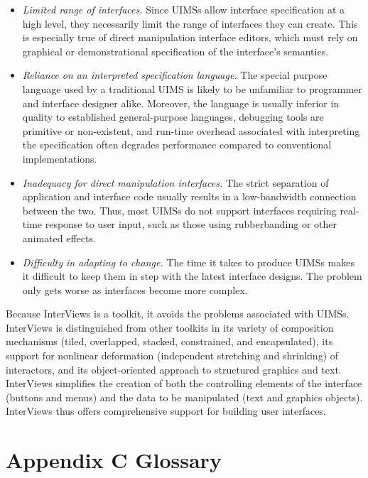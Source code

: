 \begin{itemize}

\item {\em Limited range of interfaces.}  Since UIMSs allow interface
specification at a high level, they necessarily limit the range of
interfaces they can create.  This is especially true of direct
manipulation interface editors, which must rely on graphical or
demonstrational specification of the interface's semantics.

\item {\em Reliance on an interpreted specification language.}
The special purpose language used by a traditional UIMS is likely to
be unfamiliar to programmer and interface designer alike.  Moreover,
the language is usually inferior in quality to established
general-purpose languages, debugging tools are primitive or
non-existent, and run-time overhead associated with interpreting the
specification often degrades performance compared to conventional
implementations.

\item {\em Inadequacy for direct manipulation interfaces.}  The strict
separation of application and interface code usually results in a
low-bandwidth connection between the two.  Thus, most UIMSs do not
support interfaces requiring real-time response to user input, such as
those using rubberbanding or other animated effects.

\item {\em Difficulty in adapting to change.}
The time it takes to produce UIMSs makes it difficult to keep them in
step with the latest interface designs.  The problem only gets
worse as interfaces become more complex.

\end{itemize}

Because InterViews is a toolkit, it avoids the problems associated
with UIMSs.  InterViews is distinguished from other toolkits in its
variety of composition mechanisms (tiled, overlapped, stacked,
constrained, and encapsulated), its support for nonlinear deformation
(independent stretching and shrinking) of interactors, and its
object-oriented approach to structured graphics and text.  InterViews
simplifies the creation of both the controlling elements of the
interface (buttons and menus) and the data to be manipulated (text and
graphics objects).  InterViews thus offers comprehensive support for
building user interfaces.

\clearpage

\section*{Appendix C \newline Glossary}

